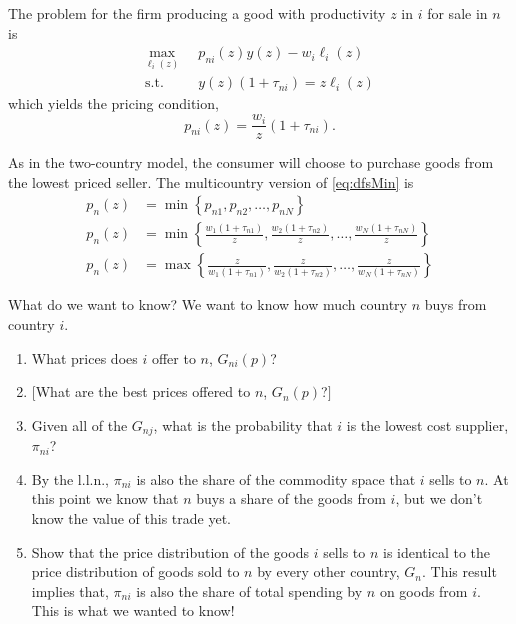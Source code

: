 \documentclass[11pt, pdftex]{article}
\begin{document}
The problem for the firm producing a good with productivity $z$ in $i$ for sale in $n$ is
\begin{align}
  \max_{\ell_i(z)} \;\; & p_{ni}(z) y(z) - w_i\ell_i(z)\\
  \text{s.t.} \quad & y(z) (1+\tau_{ni}) = z\ell_i(z)
\end{align}
which yields the pricing condition,
\begin{equation}\label{eq:ekFrimPrice}
    p_{ni}(z) = \frac{w_i}{z}\left(1+\tau_{ni} \right).
\end{equation}

As in the two-country model, the consumer will choose to purchase goods from the lowest priced seller.  The multicountry version of \eqref{eq:dfsMin} is
\begin{align}
    p_n(z) &= \min\left\{ p_{n1}, p_{n2}, \ldots, p_{nN} \right \}\\
    p_n(z) &= \min\left\{ \frac{w_1\left(1+\tau_{n1} \right)}{z}, \frac{w_2\left(1+\tau_{n2} \right)}{z}, \ldots, \frac{w_N\left(1+\tau_{nN} \right)}{z} \right \}\\
    p_n(z) &= \max\left\{ \frac{z}{w_1\left(1+\tau_{n1} \right)}, \frac{z}{w_2\left(1+\tau_{n2} \right)}, \ldots, \frac{z}{w_N\left(1+\tau_{nN} \right)} \right \}
\end{align}

What do we want to know?  We want to know how much country $n$ buys from country $i$.
\begin{enumerate}
  \item What prices does $i$ offer to $n$, $G_{ni}(p)$?
  \item $[$What are the best prices offered to $n$, $G_n(p)$?$]$
  \item Given all of the $G_{nj}$, what is the probability that $i$ is the lowest cost supplier, $\pi_{ni}$?
  \item By the l.l.n., $\pi_{ni}$ is also the share of the commodity space that $i$ sells to $n$. At this point we know that $n$ buys a share of the goods from $i$, but we don't know the value of this trade yet.
  \item Show that the price distribution of the goods $i$ sells to $n$ is identical to the price distribution of goods sold to $n$ by every other country, $G_n$. This result implies that, $\pi_{ni}$ is also the share of total spending by $n$ on goods from $i$.  This is what we wanted to know!
\end{enumerate}
\end{document}
